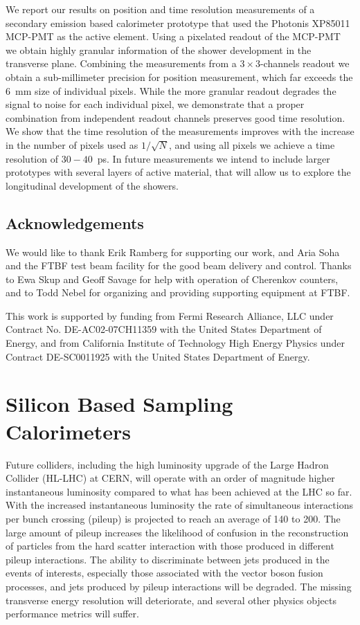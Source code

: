 We report our results on position and time resolution measurements of a
secondary emission based calorimeter prototype that used the Photonis XP85011
MCP-PMT as the active element. Using a pixelated readout of the MCP-PMT we
obtain highly granular information of the shower development in the
transverse plane. Combining the measurements from a $3\times3$-channels readout
we obtain a sub-millimeter precision for position measurement, which far exceeds
the 6~mm size of individual pixels. While the more granular readout degrades
the signal to noise for each individual pixel, we demonstrate that a proper combination from 
independent readout channels preserves good time resolution. We show that the time resolution 
of the measurements improves with the increase in the number of pixels used as 
$1/\sqrt{N}$, and using all pixels we achieve a time resolution of $30-40$~ps. 
In future measurements we intend to include larger prototypes with several layers of active
material, that will allow us to explore the longitudinal development of the
showers.

\subsection{Acknowledgements}
We would like to thank Erik Ramberg for supporting 
our work, and Aria Soha and the FTBF test beam facility for the good beam
delivery and control. Thanks to Ewa Skup and Geoff Savage for help with
operation of Cherenkov counters, and to Todd Nebel for organizing and providing
supporting equipment at FTBF. 

This work is supported by funding from Fermi Research Alliance, LLC under
Contract No. DE-AC02-07CH11359 with the United States Department of Energy, and
from California Institute of Technology High Energy Physics under Contract
DE-SC0011925 with the United States Department of Energy.

\clearpage
\section{Silicon Based Sampling Calorimeters}\label{sil-cal}
Future colliders, including the high luminosity upgrade of the Large Hadron
Collider (HL-LHC) at CERN, will operate with an order of magnitude higher
instantaneous luminosity compared to what has been achieved at the LHC so far.
With the increased instantaneous luminosity the rate of simultaneous
interactions per bunch crossing (pileup) is projected to reach an average of 140
to 200. The large amount of pileup increases the likelihood of confusion in the
reconstruction of particles from the hard scatter interaction with those
produced in different pileup interactions. The ability to discriminate between
jets produced in the events of interests, especially those associated with the
vector boson fusion processes, and jets produced by pileup interactions will be
degraded. The missing transverse energy resolution will deteriorate, and several
other physics objects performance metrics will suffer.

